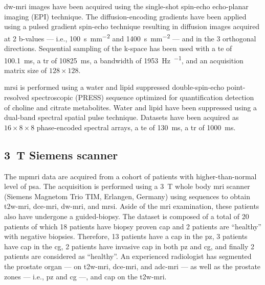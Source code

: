 \ac{dw}-\ac{mri} images have been acquired using the single-shot spin-echo echo-planar imaging (EPI) technique.
The diffusion-encoding gradients have been applied using a pulsed gradient spin-echo technique resulting in diffusion images acquired at 2 b-values --- i.e., \SI{100}{\second\per\milli\meter\squared} and \SI{1400}{\second\per\milli\meter\squared} --- and in the 3 orthogonal directions.
Sequential sampling of the k-space has been used with a \ac{te} of \SI{100.1}{\ms}, a \ac{tr} of \SI{10825}{\ms}, a bandwidth of \SI{1953}{\hertz\per\px}, and an acquisition matrix size of $128 \times 128$.

\ac{mrsi} is performed using a water and lipid suppressed double-spin-echo point-resolved spectroscopic (PRESS) sequence optimized for quantification detection of choline and citrate metabolites.
Water and lipid have been suppressed using a dual-band spectral spatial pulse technique.
Datasets have been acquired as $16 \times 8 \times 8$ phase-encoded spectral arrays, a \ac{te} of \SI{130}{\ms}, a \ac{tr} of \SI{1000}{\ms}.%

\subsection{\SI{3}{\tesla} Siemens scanner}

The \ac{mpmri} data are acquired from a cohort of patients with higher-than-normal level of \ac{psa}.
The acquisition is performed using a \SI{3}{\tesla} whole body \ac{mri} scanner (Siemens Magnetom Trio TIM, Erlangen, Germany) using sequences to obtain \ac{t2w}-\ac{mri}, \ac{dce}-\ac{mri}, \ac{dw}-\ac{mri}, and \ac{mrsi}.
Aside of the \ac{mri} examination, these patients also have undergone a guided-biopsy.
The dataset is composed of a total of 20 patients of which 18 patients have biopsy proven \ac{cap} and 2 patients are ``healthy'' with negative biopsies.
Therefore, 13 patients have a \ac{cap} in the \ac{pz}, 3 patients have \ac{cap} in the \ac{cg}, 2 patients have invasive \ac{cap} in both \ac{pz} and \ac{cg}, and finally 2 patients are considered as ``healthy''.
An experienced radiologist has segmented the prostate organ --- on \ac{t2w}-\ac{mri}, \ac{dce}-\ac{mri}, and \ac{adc}-\ac{mri} --- as well as the prostate zones --- i.e., \ac{pz} and \ac{cg} ---, and \ac{cap} on the \ac{t2w}-\ac{mri}.

